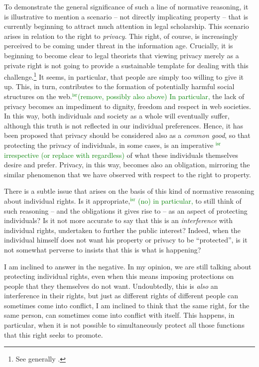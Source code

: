 \documentclass[12pt,a4paper]{book} %
\newcommand{\isr}[1]{\textcolor{green}{$^{\textrm{isr}}${#1}}}
\begin{document}
To demonstrate the general significance of such a line of normative reasoning, it is illustrative to mention a scenario -- not directly implicating property -- that is currently beginning to attract much attention in legal scholarship. This scenario arises in relation to the right to {\it privacy}. This right, of course, is increasingly perceived to be coming under threat in the information age. Crucially, it is beginning to become clear to legal theorists that viewing privacy merely as a private right is not going to provide a sustainable template for dealing with this challenge.\footnote{See generally \cite{schafer14}.} It seems, in particular, that people are simply too willing to give it up. This, in turn, contributes to the formation of potentially harmful social structures on the web.\isr{(remove, possibly also above) In particular,} the lack of privacy becomes an impediment to dignity, freedom and respect in web societies. In this way, both individuals and society as a whole will eventually suffer, although this truth is not reflected in our individual preferences. Hence, it has been proposed that privacy should be considered also as a {\it common good}, so that protecting the privacy of individuals, in some cases, is an imperative \isr{irrespective (or replace with regardless)} of what these individuals themselves desire and prefer. Privacy, in this way, becomes also an obligation, mirroring the similar phenomenon that we have observed with respect to the right to property.

There is a subtle issue that arises on the basis of this kind of normative reasoning about individual rights. Is it appropriate,\isr{ (no) in particular,} to still think of such reasoning -- and the obligations it gives rise to -- as an aspect of protecting individuals? Is it not more accurate to say that this is an {\it interference} with individual rights, undertaken to further the public interest? Indeed, when the individual himself does not want his property or privacy to be ``protected'', is it not somewhat perverse to insists that this is what is happening? 

I am inclined to answer in the negative. In my opinion, we are still talking about protecting individual rights, even when this means imposing protections on people that they themselves do not want. Undoubtedly, this is {\it also} an interference in their rights, but just as different rights of different people can sometimes come into conflict, I am inclined to think that the same right, for the same person, can sometimes come into conflict with itself. This happens, in particular, when it is not possible to simultaneously protect all those functions that this right seeks to promote. 
\end{document}
